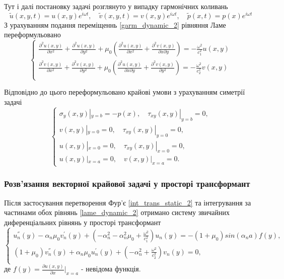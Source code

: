 Тут і далі постановку задачі розглянуто у випадку гармонічних коливань
\begin{equation}\label{garm_dynamic_2}
    \widetilde{u}(x,y,t) = u(x,y) e^{i \omega t}, \quad  \widetilde{v}(x,y,t) = v(x,y) e^{i \omega t}, \quad  \widetilde{p}(x,t) = p(x) e^{i \omega t}
\end{equation}
З урахуванням подання переміщеннь \eqref{garm_dynamic_2} рівняння Ламе переформульовано
\begin{equation}\label{lame_dynamic_2}
    \begin{cases}
        \frac{\partial^2 u(x,y)}{\partial x^2} + \frac{\partial^2 u(x,y)}{\partial y^2} + \mu_0 (\frac{\partial^2 u(x,y)}{\partial x^2} + \frac{\partial^2 v(x,y)}{\partial x\partial y}) = -\frac{\omega^2}{c_1^2}  u(x,y) \\
        \frac{\partial^2 v(x,y)}{\partial x^2} + \frac{\partial^2 v(x,y)}{\partial y^2} + \mu_0 (\frac{\partial^2 u(x,y)}{\partial x \partial y} + \frac{\partial^2 v(x,y)}{\partial y^2}) = -\frac{\omega^2}{c_2^2} v(x,y) \\
    \end{cases}
\end{equation}

Відповідно до цього переформульовано крайові умови з урахуванням симетрії задачі
\begin{equation}\label{bound_dynamic_2}
    \begin{cases}
        \sigma_y(x, y) |_{y=b} = -p(x), \quad  \tau_{xy}(x,y) |_{y=b} =0, \\
        v(x,y) |_{y=0} = 0, \quad \tau_{xy}(x,y) |_{y=0} = 0, \\
        u(x,y) |_{x=0} = 0, \quad \tau_{xy}(x,y) |_{x=0} = 0, \\
        u(x,y) |_{x=a} = 0, \quad v(x,y) |_{x=a} = 0.
    \end{cases}
\end{equation}

\subsubsection{Розв'язання векторної крайової задачі у просторі трансформант}
Після застосування перетворення Фур'є \eqref{int_trans_static_2} та інтегрування за частинами обох рівнянь \eqref{lame_dynamic_2} отримано систему звичайних диференціальних рівнянь у просторі трансформант
\begin{equation}\label{transf_dynamic_2}
    \begin{cases}
        u_n^{''}(y) - \alpha_n \mu_0 v_n^{'}(y) + (-\alpha_n^2 -\alpha_n^2 \mu_0 + \frac{\omega^2}{c_1^2}) u_n(y) = -(1 + \mu_0)sin(\alpha_n a) f(y), \\
        (1 + \mu_0) v_n^{''}(y) + \alpha_n \mu_0 u_n^{'}(y) + (- \alpha_n^2 + \frac{\omega^2}{c_2^2}) v_n(y) = 0,\\
    \end{cases}
\end{equation}
де $f(y) = \frac{\partial u(x,y)}{\partial x}|_{x=a}$ - невідома функція.

